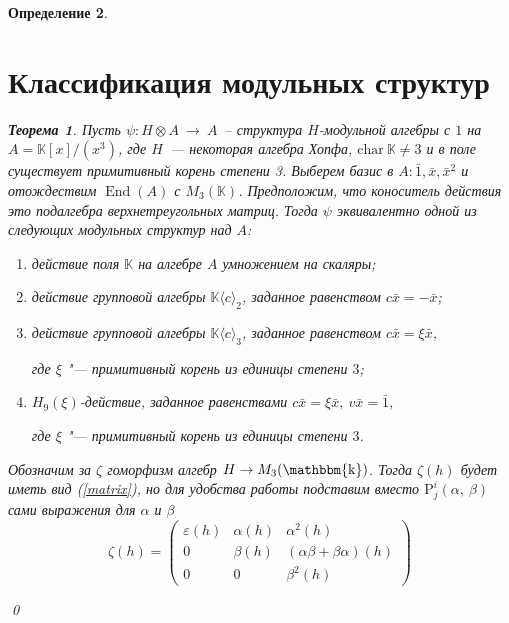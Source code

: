 \documentclass[12pt, reqno, a4paper, oneside, notitlepage]{amsart}
\makeatletter
\theoremstyle{mytheoremstyle}
\newtheorem{theorem}{Теорема}[section]
\theoremstyle{myremarkstyle}
\newtheorem{definition}[theorem]{Определение}
\numberwithin{equation}{section}
\renewenvironment{proof}[1][\proofname]{\par\indent {\bfseries #1\@addpunct{.} }}{\qed}
\DeclareMathOperator{\End}{End}
\DeclareMathOperator{\fld}{\mathbbm{k}}
\makeatother
\begin{document}
\begin{definition}
\newpage
\section{Классификация модульных структур}

\begin{theorem}
	Пусть $\psi:H \otimes A\ \to \ A $~-- структура $H$-модульной алгебры с $1$ на $A = \mathbb{K}[x]/(x^3)$, где $H$~--- некоторая алгебра Хопфа, $\mathrm{char} \ \mathbb{K} \neq 3$ и в поле существует примитивный корень степени 3. Выберем базис в $A: \bar 1, \bar x, \bar x^2$ и отождествим $\End(A)$ с $M_3(\mathbb{K})$. Предположим, что коноситель действия это подалгебра верхнетреугольных матриц. Тогда $\psi$ эквивалентно одной из следующих модульных структур над $A$:
    
    \begin{enumerate}
        \item действие поля $\mathbb{K}$ на алгебре $A$ умножением на скаляры; \label{scalar}
        
        \item действие групповой алгебры $\mathbb{K}\langle c\rangle_2$, заданное равенством 
        ${c\bar{x} = -\bar{x}}$; \label{eps=b^2}
        
        \item действие групповой алгебры $\mathbb{K}\langle c \rangle_3$, заданное равенством $c\bar{x} = \xi \bar{x}$,
        
        где $\xi$ "--- примитивный корень из единицы степени $3$;\label{diagonal} 
        
        \item $H_9(\xi)$-действие, заданное равенствами $c\bar{x}=\xi\bar{x},\ v\bar{x}= \bar{1}$, 
        
        где $\xi$ "--- примитивный корень из единицы степени $3$. \label{all}
        
    \end{enumerate}
\end{theorem}


\begin{proof}
  Обозначим за $\zeta$ гоморфизм алгебр $H \to M_3(\fld)$. Тогда $\zeta(h)$ будет иметь вид (\ref{matrix}), но для удобства работы подставим вместо $\mathrm{P}^i_j(\alpha,\ \beta)$ сами выражения для $\alpha$ и $\beta$
    \[\zeta(h) = 
    \begin{pmatrix}
        \varepsilon(h) & \alpha(h) & \alpha^2(h)\\
         0 & \beta(h) & (\alpha\beta + \beta\alpha)(h) \\
         0 & 0 & \beta^2(h)
    \end{pmatrix}\]
  

\end{proof}
\end{definition}
\end{document}
